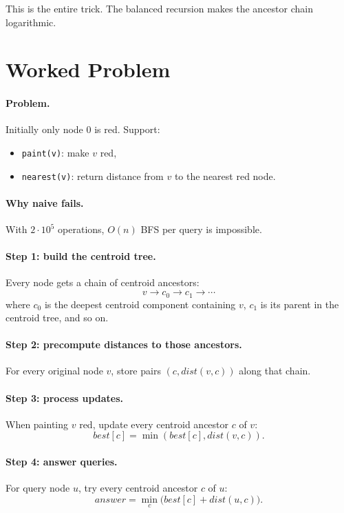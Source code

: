 This is the entire trick. The balanced recursion makes the ancestor chain logarithmic.

\section*{Worked Problem}

\paragraph{Problem.}
Initially only node \(0\) is red. Support:

\begin{itemize}
  \item \texttt{paint(v)}: make \(v\) red,
  \item \texttt{nearest(v)}: return distance from \(v\) to the nearest red node.
\end{itemize}

\paragraph{Why naive fails.}
With \(2 \cdot 10^5\) operations, \(O(n)\) BFS per query is impossible.

\paragraph{Step 1: build the centroid tree.}
Every node gets a chain of centroid ancestors:
\[
v \rightarrow c_0 \rightarrow c_1 \rightarrow \cdots
\]
where \(c_0\) is the deepest centroid component containing \(v\), \(c_1\) is its parent in the centroid tree, and so
on.

\paragraph{Step 2: precompute distances to those ancestors.}
For every original node \(v\), store pairs \((c, dist(v,c))\) along that chain.

\paragraph{Step 3: process updates.}
When painting \(v\) red, update every centroid ancestor \(c\) of \(v\):
\[
best[c] = \min(best[c], dist(v,c)).
\]

\paragraph{Step 4: answer queries.}
For query node \(u\), try every centroid ancestor \(c\) of \(u\):
\[
answer = \min_c \bigl(best[c] + dist(u,c)\bigr).
\]

